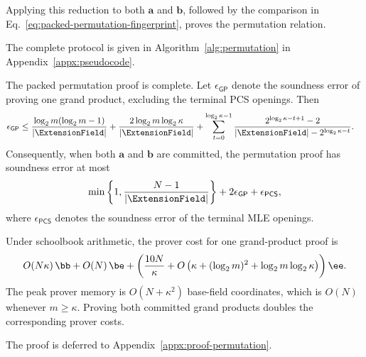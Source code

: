 Applying this reduction to both \(\bm a\) and \(\bm b\), followed
by the comparison in
Eq.~\eqref{eq:packed-permutation-fingerprint}, proves the
permutation relation.

The complete protocol is given in Algorithm~\ref{alg:permutation}
in Appendix~\ref{appx:pseudocode}.

\begin{proposition}
\label{proposition:permutation-complexity}
The packed permutation proof is complete. Let
\(\epsilon_{\mathsf{GP}}\) denote the soundness error of proving
one grand product, excluding the terminal PCS openings. Then
\[
\begin{aligned}
    \epsilon_{\mathsf{GP}}
    \leq\;&
    \frac{
        \log_2m(\log_2m-1)
    }{
        |\ExtensionField|
    }
    +
    \frac{
        2\log_2m\log_2\kappa
    }{
        |\ExtensionField|
    }
    +
    \sum_{t=0}^{\log_2\kappa-1}
    \frac{
        2^{\log_2\kappa-t+1}-2
    }{
        |\ExtensionField|
        -
        2^{\log_2\kappa-t}
    }.
\end{aligned}
\]
Consequently, when both \(\bm a\) and \(\bm b\) are committed,
the permutation proof has soundness error at most
\[
    \min\left\{
        1,
        \frac{N-1}{|\ExtensionField|}
    \right\}
    +
    2\epsilon_{\mathsf{GP}}
    +
    \epsilon_{\mathsf{PCS}},
\]
where \(\epsilon_{\mathsf{PCS}}\) denotes the soundness error of
the terminal MLE openings.

Under schoolbook arithmetic, the prover cost for one
grand-product proof is
\[
    O(N\kappa)\,\bb
    +
    O(N)\,\be
    +
    \left(
        \frac{10N}{\kappa}
        +
        O\left(
            \kappa
            +
            (\log_2m)^2
            +
            \log_2m\log_2\kappa
        \right)
    \right)\ee.
\]
The peak prover memory is \(O(N+\kappa^2)\) base-field
coordinates, which is \(O(N)\) whenever \(m\geq\kappa\).
Proving both committed grand products doubles the corresponding
prover costs.
\end{proposition}

The proof is deferred to Appendix~\ref{appx:proof-permutation}.
